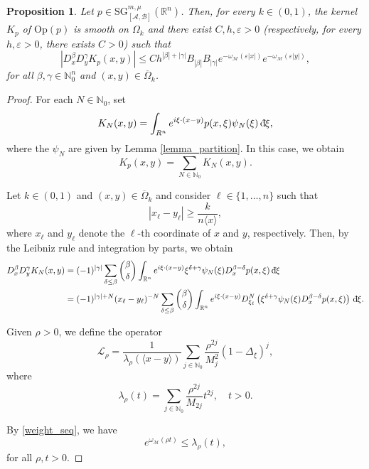 \documentclass[11pt,reqno]{amsart}
\numberwithin{equation}{section}
\newcommand{\dbar}{\mathrm{d}\hspace*{-0.15em}\bar{}\hspace*{0.1em}}
\newtheorem{proposition}[theorem]{Proposition}
\newcommand{\R}{{\mathbb{R}}} %
\newcommand{\N}{{\mathbb{N}}} %
\newcommand{\Op}{{\mathrm{Op}}}
\newcommand{\SG}{{\mathrm{SG}}}
\newcommand{\M}{{\mathcal{M}}} %
\newcommand{\A}{{\mathcal{A}}} %
\newcommand{\B}{{\mathcal{B}}} %
\begin{document}
\begin{proposition}\label{est_kernel}
	Let $p\in {\SG}_{[\A,\B]}^{m,\mu}(\R^n)$. Then, for every $k\in(0,1)$, the kernel $K_p$ of $\Op(p)$ is smooth on $\Omega_k$ and there exist $C,h,\varepsilon>0$ (respectively, for every $h,\varepsilon>0$, there exists $C>0$) such that
	\begin{equation*}
		|D_x^\beta D_y^\gamma K_p(x,y)|\leq Ch^{|\beta|+|\gamma|}B_{|\beta|}B_{|\gamma|}e^{-\omega_{\M}(\varepsilon|x|)}e^{-\omega_{\M}(\varepsilon|y|)},
	\end{equation*}
	for all $\beta,\gamma\in\N_0^n$ and $(x,y)\in\overline{\Omega}_k$.
\end{proposition}
%
\begin{proof}
	For each $N\in\N_0$, set
	\[K_N(x,y)=\int_{R^n}e^{i\xi\cdot(x-y)}p(x,\xi)\psi_N(\xi)\,\dbar\xi,\]
	where the $\psi_N$ are given by Lemma \ref{lemma_partition}. In this case, we obtain
	\[K_p(x,y) = \sum_{N\in\N_0}K_N(x,y).\]
	
	Let $k\in(0,1)$ and $(x,y)\in\overline{\Omega}_k$ and consider $\ell\in\{1,\dots,n\}$ such that
	\begin{equation}\label{x_ell_y_ell}
		|x_\ell- y_\ell| \geq \frac{k}{n\langle x\rangle},
	\end{equation}
	where $x_\ell$ and $y_\ell$ denote the $\ell$-th coordinate of $x$ and $y$, respectively. Then, by the Leibniz rule and integration by parts, we obtain
	\begin{align*}
		D_x^\beta D_y^\gamma K_N(x,y) & = (-1)^{|\gamma|}\sum_{\delta\leq\beta}\binom{\beta}{\delta}\int_{\R^n}e^{i\xi\cdot (x-y)}\xi^{\delta+\gamma}\psi_N(\xi) D_x^{\beta-\delta}p(x,\xi)\,\dbar\xi\\
		& = (-1)^{|\gamma|+N}(x_\ell-y_\ell)^{-N}\sum_{\delta\leq\beta}\binom{\beta}{\delta}\int_{\R^n}e^{i\xi\cdot (x-y)}D_{\xi_\ell}^N\left(\xi^{\delta+\gamma}\psi_N(\xi) D_x^{\beta-\delta}p(x,\xi)\right)\,\dbar\xi.
	\end{align*}
	
	Given $\rho>0$, we define the operator
	\begin{equation*}
		\mathcal{L}_\rho = \frac{1}{\lambda_\rho(\langle x-y\rangle)}\sum_{j\in\N_0}\frac{\rho^{2j}}{M_{j}^2}(1-\Delta_\xi)^j,
	\end{equation*}
	where
	\[\lambda_\rho(t) = \sum_{j\in\N_0}\frac{\rho^{2j}}{M_{2j}} t^{2j},\quad t > 0.\]
	
	By \eqref{weight_seq}, we have
	\begin{equation}\label{est_lambda_rho}
		e^{\omega_{\M}(\rho t)} \leq \lambda_\rho(t),
	\end{equation}
	for all $\rho,t>0$.	
	

\end{proof}
\end{document}
